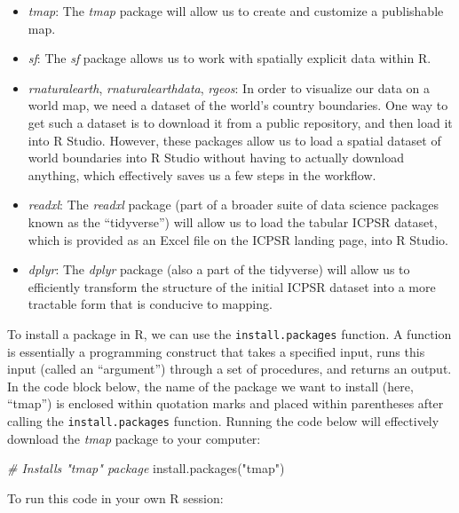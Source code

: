 \documentclass[
]{article}
\newenvironment{Shaded}{\begin{snugshade}}{\end{snugshade}}
\newcommand{\CommentTok}[1]{\textcolor[rgb]{0.56,0.35,0.01}{\textit{#1}}}
\newcommand{\FunctionTok}[1]{\textcolor[rgb]{0.00,0.00,0.00}{#1}}
\newcommand{\NormalTok}[1]{#1}
\newcommand{\StringTok}[1]{\textcolor[rgb]{0.31,0.60,0.02}{#1}}
\providecommand{\tightlist}{%
  \setlength{\itemsep}{0pt}\setlength{\parskip}{0pt}}
\begin{document}
\begin{itemize}
\tightlist
\item
  \emph{tmap}: The \emph{tmap} package will allow us to create and customize a publishable map.
\item
  \emph{sf}: The \emph{sf} package allows us to work with spatially explicit data within R.
\item
  \emph{rnaturalearth}, \emph{rnaturalearthdata}, \emph{rgeos}: In order to visualize our data on a world map, we need a dataset of the world's country boundaries. One way to get such a dataset is to download it from a public repository, and then load it into R Studio. However, these packages allow us to load a spatial dataset of world boundaries into R Studio without having to actually download anything, which effectively saves us a few steps in the workflow.
\item
  \emph{readxl}: The \emph{readxl} package (part of a broader suite of data science packages known as the ``tidyverse'') will allow us to load the tabular ICPSR dataset, which is provided as an Excel file on the ICPSR landing page, into R Studio.
\item
  \emph{dplyr}: The \emph{dplyr} package (also a part of the tidyverse) will allow us to efficiently transform the structure of the initial ICPSR dataset into a more tractable form that is conducive to mapping.
\end{itemize}

To install a package in R, we can use the \texttt{install.packages} function. A function is essentially a programming construct that takes a specified input, runs this input (called an ``argument'') through a set of procedures, and returns an output. In the code block below, the name of the package we want to install (here, ``tmap'') is enclosed within quotation marks and placed within parentheses after calling the \texttt{install.packages} function. Running the code below will effectively download the \emph{tmap} package to your computer:

\begin{Shaded}
\begin{Highlighting}[]
\CommentTok{\# Installs "tmap" package}
\FunctionTok{install.packages}\NormalTok{(}\StringTok{"tmap"}\NormalTok{)}
\end{Highlighting}
\end{Shaded}

To run this code in your own R session:
\end{document}
